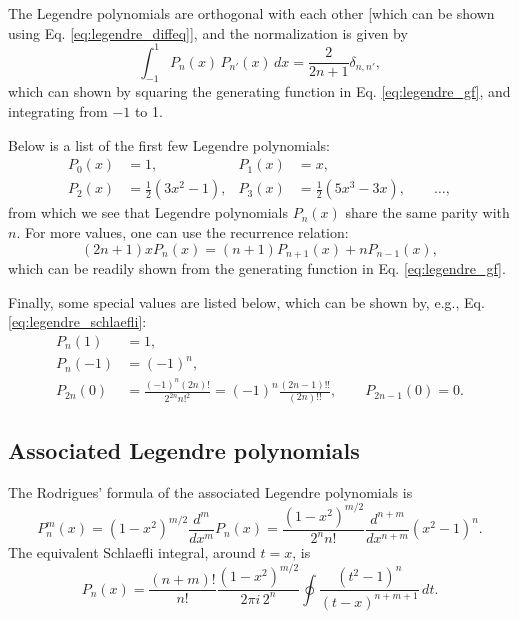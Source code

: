 \documentclass[11pt]{article}
\begin{document}
The Legendre polynomials are orthogonal with each other
[which can be shown using Eq. \eqref{eq:legendre_diffeq}],
and the normalization is given by
\begin{equation}
  \int_{-1}^1
  P_n(x) \, P_{n'}(x) \, dx
=
  \frac { 2 } { 2 n + 1} \delta_{n, n'},
  \label{eq:legendre_orthonormal}
\end{equation}
which can shown by squaring
the generating function in Eq. \eqref{eq:legendre_gf},
and integrating from $-1$ to 1.

Below is a list of the first few Legendre polynomials:
%
\begin{align*}
  P_0(x) &= 1, &
  P_1(x) &= x, \\
  P_2(x) &= \frac{1}{2}(3 x^2 - 1), &
  P_3(x) &= \frac{1}{2}(5 x^3 - 3 x),
  \qquad \dots,
\end{align*}
from which we see that
Legendre polynomials $P_n(x)$ share the same parity with $n$.
For more values, one can use the recurrence relation:
\begin{equation}
  (2 n + 1) x P_n(x) = (n + 1) P_{n+1}(x) + n P_{n-1}(x),
\end{equation}
which can be readily shown from the generating function in Eq. \eqref{eq:legendre_gf}.

Finally, some special values are listed below,
which can be shown by, e.g., Eq. \eqref{eq:legendre_schlaefli}:
%
\begin{align}
  P_n(1)    &= 1,
  \label{eq:legendre_1} \\
  P_n(-1)   &= (-1)^n,
  \label{eq:legendre_neg1} \\
  P_{2n}(0) &= \frac{ (-1)^n (2 n)! }{ 2^{2n} n!^2 }
             = (-1)^n \frac{ (2 n - 1)!! } { (2n)!! },
  \qquad
  P_{2n-1}(0) = 0.
  \label{eq:legendre_0}
\end{align}



\subsection{Associated Legendre polynomials}



The Rodrigues' formula of the associated Legendre polynomials is
%
\begin{equation}
  P_n^m(x)
= (1 - x^2)^{m/2}
  \frac{d^m}{dx^m}
  P_n(x)
=
  \frac{(1 - x^2)^{m/2}}{2^n n!}
  \frac{d^{n+m}}{dx^{n+m}}
  (x^2 - 1)^n.
  \label{eq:alegendre_rodrigues}
\end{equation}
%
The equivalent Schlaefli integral, around $t = x$, is
\begin{equation}
  P_n(x)
=
  \frac{ (n + m)! } { n! }
  \frac{ (1 - x^2)^{m/2} }{2\pi i \, 2^n}
  \oint
  \frac{ (t^2 - 1)^n } { (t - x)^{n+m+1} } \, dt.
  \label{eq:alegendre_schlaefli}
\end{equation}
\end{document}

